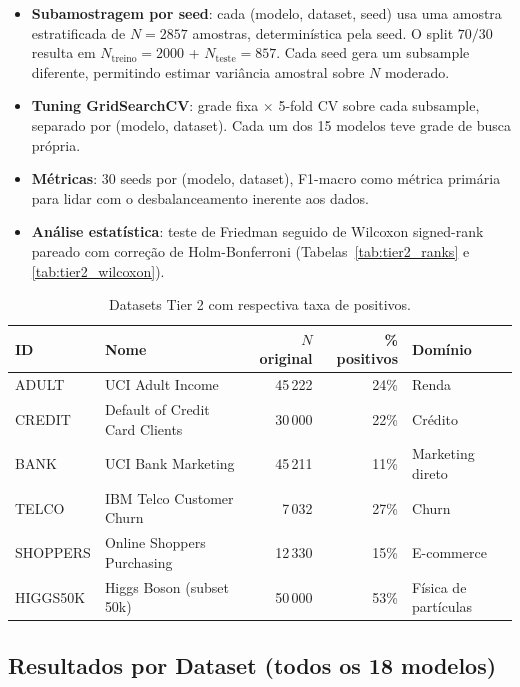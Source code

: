 \documentclass[12pt,a4paper]{article}
\begin{document}
\begin{itemize}
  \item \textbf{Subamostragem por seed}: cada (modelo, dataset, seed) usa
        uma amostra estratificada de $N{=}2857$ amostras, determinística pela
        seed. O split $70/30$ resulta em $N_{\text{treino}}{=}2000$ +
        $N_{\text{teste}}{=}857$. Cada seed gera um subsample diferente,
        permitindo estimar variância amostral sobre $N$ moderado.
  \item \textbf{Tuning GridSearchCV}: grade fixa $\times$ 5-fold CV sobre cada
        subsample, separado por (modelo, dataset). Cada um dos 15 modelos teve
        grade de busca própria.
  \item \textbf{Métricas}: 30 seeds por (modelo, dataset), F1-macro como
        métrica primária para lidar com o desbalanceamento inerente aos dados.
  \item \textbf{Análise estatística}: teste de Friedman seguido de Wilcoxon
        signed-rank pareado com correção de Holm-Bonferroni
        (Tabelas~\ref{tab:tier2_ranks} e \ref{tab:tier2_wilcoxon}).
\end{itemize}

\begin{table}[H]
\centering
\caption{Datasets Tier 2 com respectiva taxa de positivos.}
\label{tab:datasets_tier2}
\begin{tabular}{llrrl}
\toprule
\textbf{ID} & \textbf{Nome} & \textbf{$N$ original} & \textbf{\% positivos} & \textbf{Domínio} \\
\midrule
ADULT     & UCI Adult Income               & 45\,222 & 24\% & Renda \\
CREDIT    & Default of Credit Card Clients & 30\,000 & 22\% & Crédito \\
BANK      & UCI Bank Marketing             & 45\,211 & 11\% & Marketing direto \\
TELCO     & IBM Telco Customer Churn       &  7\,032 & 27\% & Churn \\
SHOPPERS  & Online Shoppers Purchasing     & 12\,330 & 15\% & E-commerce \\
HIGGS50K  & Higgs Boson (subset 50k)       & 50\,000 & 53\% & Física de partículas \\
\bottomrule
\end{tabular}
\end{table}

\subsection{Resultados por Dataset (todos os 18 modelos)}
\end{document}
